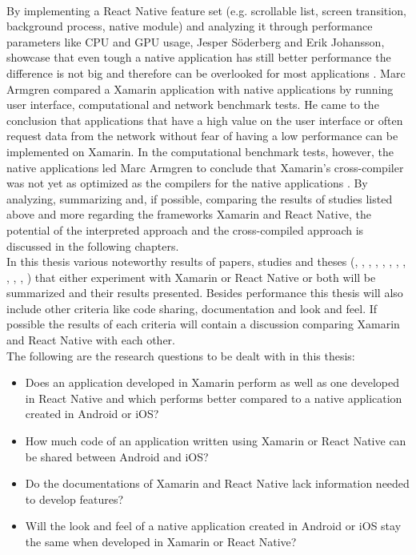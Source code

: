 \documentclass[Bachelor,BIF,english]{twbook}
\begin{document}
\\[\baselineskip]
By implementing a React Native feature set (e.g. scrollable list, screen transition, background process, native module) and analyzing it through performance parameters like CPU and GPU usage, Jesper Söderberg and Erik Johansson, showcase that even tough a native application has still better performance the difference is not big and therefore can be overlooked for most applications \cite{JohanssonSderberg2018}. Marc Armgren compared a Xamarin application with native applications by running user interface, computational and network benchmark tests. He came to the conclusion that applications that have a high value on the user interface or often request data from the network without fear of having a low performance can be implemented on Xamarin. In the computational benchmark tests, however, the native applications led Marc Armgren to conclude that Xamarin's cross-compiler was not yet as optimized as the compilers for the native applications \cite{Armgren_2015}. By analyzing, summarizing and, if possible, comparing the results of studies listed above and more regarding the frameworks Xamarin and React Native, the potential of the interpreted approach and the cross-compiled approach is discussed in the following chapters.
\\[\baselineskip]
In this thesis various noteworthy results of papers, studies and theses (\cite{Danielsson_2016}, \cite{Axelsson2016}, \cite{Hansson_Vidhall_2016}, \cite{MartinezLecomte2018}, \cite{ZubaBernhard2017EdPb}, \cite{WillocxVossaertNaessens2015}, \cite{MartinezLecomte2017}, \cite{Dickson_2013}, \cite{GaouarBenamarBendimerad2016}, \cite{7479278}, \cite{LinckArne2016}, \cite{7934674}) that either experiment with Xamarin or React Native or both will be summarized and their results presented. Besides performance this thesis will also include other criteria like code sharing, documentation and look and feel. If possible the results of each criteria will contain a discussion comparing Xamarin and React Native with each other. 
\\[\baselineskip]
The following are the research questions to be dealt with in this thesis:
\begin{itemize}
\item Does an application developed in Xamarin perform as well as one developed in React Native and which performs better compared to a native application created in Android or iOS?
\item How much code of an application written using Xamarin or React Native can be shared between Android and iOS?
\item Do the documentations of Xamarin and React Native lack information needed to develop features?
\item Will the look and feel of a native application created in Android or iOS stay the same when developed in Xamarin or React Native?
\end{itemize}
\end{document}
